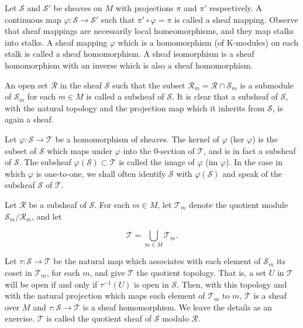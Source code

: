 \begin{definition}\label{thm:5.4}
Let $\mathcal{S}$ and $\mathcal{S}'$ be sheaves on $M$ with projections $\pi$ and $\pi'$ respectively. A continuous map $\varphi\colon \mathcal{S} \to \mathcal{S}'$ such that  $ \pi' \circ \varphi = \pi $ is called a sheaf mapping. Observe that sheaf mappings are necessarily local homeomorphisms, and they map stalks into stalks. A sheaf mapping  $ \varphi $ which is a homomorphism (of K-modules) on each stalk is called a sheaf homomorphism. A sheaf isomorphism is a sheaf homomorphism with an inverse which is also a sheaf homomorphism.

An open set $\mathcal{R}$ in the sheaf $\mathcal{S}$ such that the subset $\mathcal{R}_m = \mathcal{R} \cap \mathcal{S}_m$ is a submodule of $\mathcal{S}_m$ for each $m \in M$ is called a subsheaf of $\mathcal{S}$. It is clear that a subsheaf of $\mathcal{S}$, with the natural topology and the projection map which it inherits from $\mathcal{S}$, is again a sheaf.

Let $\varphi: \mathcal{S} \to \mathcal{T}$ be a homomorphism of sheaves. The kernel of $\varphi$ (ker $\varphi$) is the subset of $\mathcal{S}$ which maps under $\varphi$ into the 0-section of $\mathcal{T}$, and is in fact a subsheaf of $\mathcal{S}$. The subsheaf $\varphi(\mathcal{S}) \subset \mathcal{T}$ is called the image of $\varphi$ (im $\varphi$). In the case in which $\varphi$ is one-to-one, we shall often identify $\mathcal{S}$ with $\varphi(\mathcal{S})$ and speak of the subsheaf $\mathcal{S}$ of $\mathcal{T}$.

Let $\mathcal{R}$ be a subsheaf of $\mathcal{S}$. For each $m\in M$, let $\mathcal{T}_{m}$ denote the quotient module $\mathcal{S}_{m}/\mathcal{R}_{m}$, and let

\begin{equation}
\tag{1}\label{eq:5.4:1}
\mathcal{T}=\bigcup_{m\in M}\mathcal{T}_{m}.
\end{equation}

Let $\tau: \mathcal{S} \to \mathcal{T}$ be the natural map which associates with each element of $\mathcal{S}_m$ its coset in $\mathcal{T}_m$, for each $m$, and give $\mathcal{T}$ the quotient topology. That is, a set $U$ in $\mathcal{T}$ will be open if and only if $\tau^{-1}(U)$ is open in $\mathcal{S}$. Then, with this topology and with the natural projection which maps each element of $\mathcal{T}_m$ to $m$, $\mathcal{T}$ is a sheaf over $M$ and $\tau: \mathcal{S} \to \mathcal{T}$ is a sheaf homomorphism. We leave the details as an exercise. $\mathcal{T}$ is called the quotient sheaf of $\mathcal{S}$ modulo $\mathcal{R}$. 


\end{definition}
